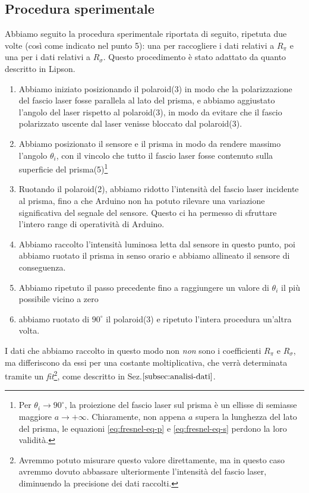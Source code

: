 \subsection{Procedura sperimentale}\label{subsec:procedura-sperimentale}
  Abbiamo seguito la procedura sperimentale riportata di seguito, ripetuta due
  volte (così come indicato nel punto 5): una per raccogliere i dati relativi a $R_\pi$ e una per i dati relativi
  a $R_\sigma$. Questo procedimento è stato adattato da quanto descritto in Lipson\cite{lipson20}.
  \begin{enumerate}
    \item%
      Abbiamo iniziato posizionando il polaroid(3) in modo che la polarizzazione del
      fascio laser fosse parallela al lato del prisma, e abbiamo aggiustato l'angolo
      del laser rispetto al polaroid(3), in modo da evitare che il fascio
      polarizzato uscente dal laser venisse bloccato dal polaroid(3).
    \item%
      Abbiamo posizionato il sensore e il prisma in modo da rendere
      massimo l'angolo $\theta_i$, con il vincolo che
      tutto il fascio laser fosse contenuto sulla superficie del prisma(5)\footnote{Per $\theta_i \to 90^\circ$, la
      proiezione del fascio laser sul prisma è un ellisse di semiasse maggiore $a \to +\infty$. Chiaramente, non appena
      $a$ supera la lunghezza del lato del prisma, le equazioni \eqref{eq:fresnel-eq-p} e \eqref{eq:fresnel-eq-s} perdono
      la loro validità.}
    \item%
      Ruotando il polaroid(2), abbiamo ridotto l’intensità del fascio laser
      incidente al prisma, fino a che Arduino non ha potuto rilevare una
      variazione significativa del segnale del sensore.
      Questo ci ha permesso di sfruttare l'intero range di operatività di Arduino.
    \item%
      Abbiamo raccolto l'intensità luminosa letta dal sensore in questo punto,
      poi abbiamo ruotato il prisma in senso orario e abbiamo
      allineato il sensore di conseguenza.
    \item%
      Abbiamo ripetuto il passo precedente fino a raggiungere un valore di $\theta_i$
      il più possibile vicino a zero
    \item%
      abbiamo ruotato di $90^\circ$ il polaroid(3) e ripetuto l'intera
      procedura un'altra volta.
  \end{enumerate}
%
  I dati che abbiamo raccolto in questo modo non \emph{non} sono
  i coefficienti $R_\pi$ e $R_\sigma$, ma differiscono da essi per una costante
  moltiplicativa, che verrà determinata tramite un \emph{fit}\footnote{Avremmo potuto misurare
  questo valore direttamente, ma in questo caso avremmo dovuto
  abbassare ulteriormente l'intensità del fascio laser, diminuendo la precisione dei
  dati raccolti.}, come descritto in Sez.$\ref{subsec:analisi-dati}$.
\endinput

